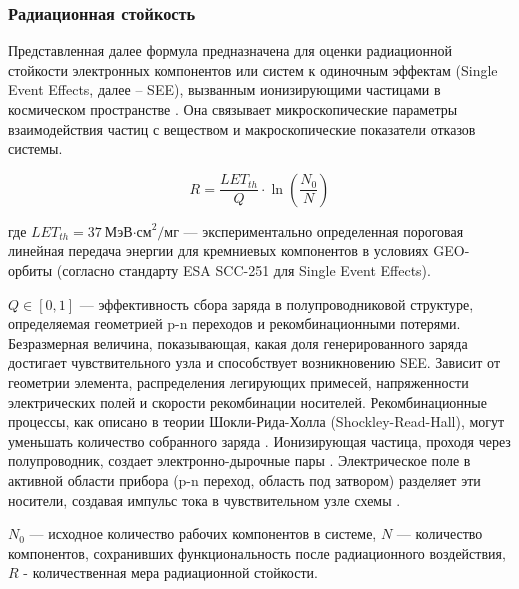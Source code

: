 \subsubsection{Радиационная стойкость}

Представленная далее формула предназначена для оценки радиационной стойкости электронных компонентов или систем к одиночным эффектам (Single Event Effects, далее -- SEE), вызванным ионизирующими частицами в космическом пространстве \cite{ESASCC25100, MILSTD883, ECSS_Q_ST_60_15C}. Она связывает микроскопические параметры взаимодействия частиц с веществом и макроскопические показатели отказов системы.

\begin{equation}
	R = \frac{LET_{th}}{Q} \cdot \ln\left(\frac{N_0}{N}\right)
\end{equation}

где $LET_{th} = 37\ \text{МэВ·см}^2/\text{мг}$ — экспериментально определенная пороговая линейная передача
энергии для кремниевых компонентов в
условиях GEO-орбиты (согласно стандарту ESA SCC-251 для Single Event Effects).

$Q \in [0,1]$ — эффективность сбора заряда в полупроводниковой структуре,
определяемая геометрией p-n переходов и рекомбинационными потерями. Безразмерная величина, показывающая, какая доля генерированного заряда достигает чувствительного узла и способствует возникновению SEE. Зависит от геометрии элемента, распределения легирующих примесей, напряженности электрических полей и скорости рекомбинации носителей. Рекомбинационные процессы, как описано в теории Шокли-Рида-Холла (Shockley-Read-Hall), могут уменьшать количество собранного заряда \cite{NASA_AnnealingKinetics}. Ионизирующая частица, проходя через полупроводник, создает электронно-дырочные пары \cite[Раздел III]{DTIC_GaAs_SchottkyRad}. Электрическое поле в активной области прибора (p-n переход, область под затвором) разделяет эти носители, создавая импульс тока в чувствительном узле схемы \cite[Раздел II]{DTIC_GaAs_SchottkyRad}.

$N_0$ —
исходное количество рабочих компонентов в системе, $N$ — количество компонентов,
сохранивших функциональность после радиационного воздействия, \textbf{$R$} - количественная мера радиационной стойкости.



